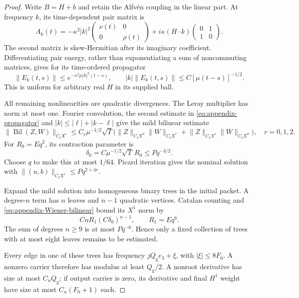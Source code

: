 \documentclass[11pt,a4paper]{amsart}
\theoremstyle{definition}
\theoremstyle{remark}
\numberwithin{equation}{section}
\newcommand{\norm}[1]{\lVert #1\rVert}
\begin{document}
\begin{proof}
Write $B=H+b$ and retain the Alfv\'en coupling in the linear part.  At
frequency $k$, its time-dependent pair matrix is
\begin{equation}\label{eq:appendix-Alfven}
 A_k(t)=-\kappa^2|k|^2\begin{pmatrix}\nu(t)&0\\0&\rho(t)\end{pmatrix}
       +i\kappa(H\cdot k)\begin{pmatrix}0&1\\1&0\end{pmatrix}.
\end{equation}
The second matrix is skew-Hermitian after its imaginary coefficient.
Differentiating pair energy, rather than exponentiating a sum of
noncommuting matrices, gives for its time-ordered propagator
\begin{equation}\label{eq:appendix-propagator}
 \norm{E_k(t,s)}\le e^{-\kappa^2\mu|k|^2(t-s)},
 \qquad |k|\norm{E_k(t,s)}\le C[\mu(t-s)]^{-1/2}.
\end{equation}
This is uniform for arbitrary real $H$ in its supplied ball.

All remaining nonlinearities are quadratic divergences.  The Leray
multiplier has norm at most one.  Fourier convolution, the second estimate
in \eqref{eq:appendix-propagator} and
$|k|\le|\ell|+|k-\ell|$ give the mild bilinear estimate
\begin{equation}\label{eq:appendix-Wiener-bilinear}
 \norm{\operatorname{Bil}(Z,W)}_{C_tX^r}
 \le C_r\mu^{-1/2}\sqrt T
  \bigl(\norm Z_{C_tX^0}\norm W_{C_tX^r}
       +\norm Z_{C_tX^r}\norm W_{C_tX^0}\bigr),\quad r=0,1,2.
\end{equation}
For $R_0=Eq^2$, its contraction parameter is
\[
 \delta_0=C\mu^{-1/2}\sqrt T\,R_0\le Pq^{-3/2}.
\]
Choose $q$ to make this at most $1/64$.  Picard iteration gives the nominal
solution with $\norm{(u,b)}_{C_tX^r}\le Pq^{2+4r}$.

Expand the mild solution into homogeneous binary trees in the initial packet.
A degree-$n$ term has $n$ leaves and $n-1$ quadratic vertices.  Catalan
counting and \eqref{eq:appendix-Wiener-bilinear} bound its $X^1$ norm by
\[
 Cn R_1(C\delta_0)^{n-1},\qquad R_1=Eq^6.
\]
The sum of degrees $n\ge9$ is at most $Pq^{-6}$.  Hence only a fixed
collection of trees with at most eight leaves remains to be estimated.

Every edge in one of these trees has frequency
$jQ_{\mathrm g}e_3+\xi$, with $|\xi|\le8F_0$.  A nonzero carrier therefore has modulus
at least $Q_{\mathrm g}/2$.  A nonroot derivative has size at most $C_nQ_{\mathrm g}$; if output
carrier is zero, its derivative and final $H^1$ weight have size at most
$C_n(F_0+1)$ each.


\end{proof}
\end{document}
